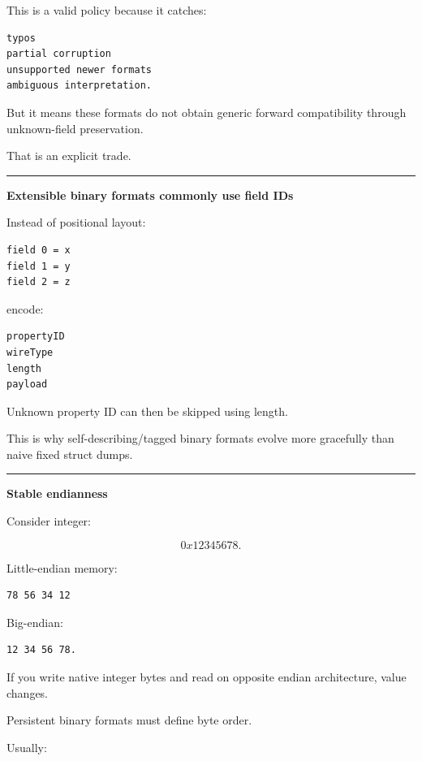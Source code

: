 This is a valid policy because it catches:

\begin{verbatim}
typos
partial corruption
unsupported newer formats
ambiguous interpretation.
\end{verbatim}

But it means these formats do not obtain generic forward compatibility through unknown-field preservation.

That is an explicit trade.

\begin{center}\rule{0.5\linewidth}{0.5pt}\end{center}

\textbf{Extensible binary formats commonly use field IDs}

Instead of positional layout:

\begin{verbatim}
field 0 = x
field 1 = y
field 2 = z
\end{verbatim}

encode:

\begin{verbatim}
propertyID
wireType
length
payload
\end{verbatim}

Unknown property ID can then be skipped using length.

This is why self-describing/tagged binary formats evolve more gracefully than naive fixed struct dumps.

\begin{center}\rule{0.5\linewidth}{0.5pt}\end{center}

\textbf{Stable endianness}

Consider integer:

\[
0x12345678.
\]

Little-endian memory:

\begin{verbatim}
78 56 34 12
\end{verbatim}

Big-endian:

\begin{verbatim}
12 34 56 78.
\end{verbatim}

If you write native integer bytes and read on opposite endian architecture, value changes.

Persistent binary formats must define byte order.

Usually:

